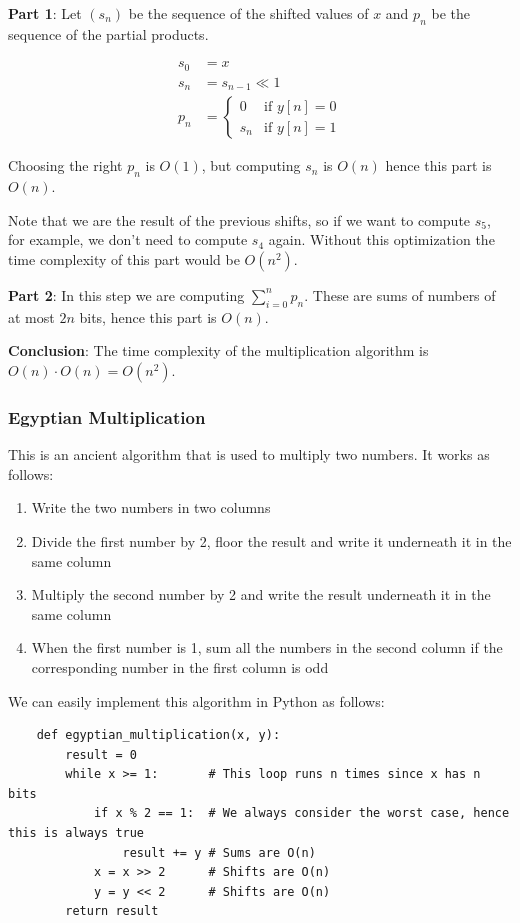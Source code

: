 \documentclass[10pt]{extarticle}
\begin{document}
\textbf{Part 1}: Let $(s_n)$ be the sequence of the shifted values of $x$ and $p_n$ be the sequence of the partial products.

\begin{align*}
    s_0 & = x                         \\
    s_n & = s_{n-1} \ll 1             \\
    p_n & = \begin{cases*}
                0   & \text{if } y[n] = 0 \\
                s_n & \text{if } y[n] = 1
            \end{cases*}
\end{align*}

Choosing the right $p_n$ is $O(1)$, but computing $s_n$ is $O(n)$ hence this part is $O(n)$.

Note that we are  the result of the previous shifts, so if we want to compute $s_5$, for example, we don't need to compute $s_4$ again.
Without this optimization the time complexity of this part would be $O(n^2)$.

\textbf{Part 2}:
In this step we are computing $\sum_{i = 0}^n p_n$.
These are sums of numbers of at most $2n$ bits, hence this part is $O(n)$.

\textbf{Conclusion}: The time complexity of the multiplication algorithm is $O(n) \cdot O(n) = O(n^2)$.

\subsubsection{Egyptian Multiplication}

This is an ancient algorithm that is used to multiply two numbers.
It works as follows:

\begin{enumerate}
    \item Write the two numbers in two columns
    \item Divide the first number by 2, floor the result and write it underneath it in the same column
    \item Multiply the second number by 2 and write the result underneath it in the same column
    \item When the first number is 1, sum all the numbers in the second column if the corresponding number in the first column is odd
\end{enumerate}

We can easily implement this algorithm in Python as follows:
\begin{verbatim}
    def egyptian_multiplication(x, y):
        result = 0
        while x >= 1:       # This loop runs n times since x has n bits
            if x % 2 == 1:  # We always consider the worst case, hence this is always true
                result += y # Sums are O(n)
            x = x >> 2      # Shifts are O(n)
            y = y << 2      # Shifts are O(n)
        return result
\end{verbatim}
\end{document}
